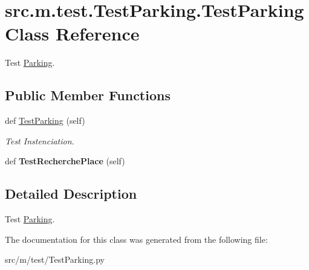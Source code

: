 \hypertarget{classsrc_1_1m_1_1test_1_1_test_parking_1_1_test_parking}{}\section{src.\+m.\+test.\+Test\+Parking.\+Test\+Parking Class Reference}
\label{classsrc_1_1m_1_1test_1_1_test_parking_1_1_test_parking}


Test \hyperlink{namespacesrc_1_1m_1_1_parking}{Parking}.  


\subsection*{Public Member Functions}
\begin{DoxyCompactItemize}
\item 
\hypertarget{classsrc_1_1m_1_1test_1_1_test_parking_1_1_test_parking_aea9a30686b5d298ee7babfbca1af20fc}{}def \hyperlink{classsrc_1_1m_1_1test_1_1_test_parking_1_1_test_parking_aea9a30686b5d298ee7babfbca1af20fc}{Test\+Parking} (self)\label{classsrc_1_1m_1_1test_1_1_test_parking_1_1_test_parking_aea9a30686b5d298ee7babfbca1af20fc}

\begin{DoxyCompactList}\small\item\em Test Instenciation. \end{DoxyCompactList}\item 
\hypertarget{classsrc_1_1m_1_1test_1_1_test_parking_1_1_test_parking_a596732fca47a657b344f84cb3692c587}{}def {\bfseries Test\+Recherche\+Place} (self)\label{classsrc_1_1m_1_1test_1_1_test_parking_1_1_test_parking_a596732fca47a657b344f84cb3692c587}

\end{DoxyCompactItemize}


\subsection{Detailed Description}
Test \hyperlink{namespacesrc_1_1m_1_1_parking}{Parking}. 

The documentation for this class was generated from the following file\+:\begin{DoxyCompactItemize}
\item 
src/m/test/Test\+Parking.\+py\end{DoxyCompactItemize}
